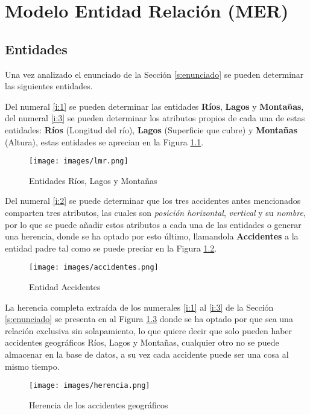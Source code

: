 \documentclass[letter,12pt]{report}
\begin{document}
\chapter{Modelo Entidad Relación (MER)}
\section{Entidades}
Una vez analizado el enunciado de la Sección \ref{s:enunciado} se pueden determinar las siguientes entidades.

Del numeral \ref{i:1} se pueden determinar las entidades \textbf{Ríos}, \textbf{Lagos} y \textbf{Montañas}, del numeral \ref{i:3} se pueden determinar los atributos propios de cada una de estas entidades: \textbf{Ríos} (Longitud del río), \textbf{Lagos} (Superficie que cubre) y \textbf{Montañas} (Altura), estas entidades se aprecian en la Figura \ref{f:lmr}. 

\begin{figure}[H]\centering
  \texttt{[image: images/lmr.png]}
  \caption{Entidades Ríos, Lagos y Montañas}
  \label{f:lmr}
\end{figure}

Del numeral \ref{i:2} se puede determinar que los tres accidentes antes mencionados comparten tres atributos, las cuales son \textit{posición horizontal}, \textit{vertical} y su \textit{nombre}, por lo que se puede añadir estos atributos a cada una de las entidades o generar una herencia, donde se ha optado por esto último, llamandola \textbf{Accidentes} a la entidad padre tal como se puede preciar en la Figura \ref{f:accidente}.

\begin{figure}[H]\centering
  \texttt{[image: images/accidentes.png]}
  \caption{Entidad Accidentes}
  \label{f:accidente}
\end{figure}

La herencia completa extraída de los numerales \ref{i:1} al \ref{i:3} de la Sección \ref{s:enunciado} se presenta en al Figura \ref{f:herencia} donde se ha optado por que sea una relación exclusiva sin solapamiento, lo que quiere decir que solo pueden haber accidentes geográficos Ríos, Lagos y Montañas, cualquier otro no se puede almacenar en la base de datos, a su vez cada accidente puede ser una cosa al mismo tiempo.

\begin{figure}[H]\centering
  \texttt{[image: images/herencia.png]}
  \caption{Herencia de los accidentes geográficos}
  \label{f:herencia}
\end{figure}
\end{document}
